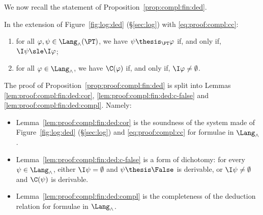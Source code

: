 We now recall the statement of Proposition~\ref{prop:compl:fin:ded}.

\begin{proposition}
\label{prop:proof:compl:fin:ded}
In the extension of Figure~\ref{fig:log:ded} (\S\ref{sec:log})
with \eqref{eq:proof:compl:cc}:
\begin{enumerate}[(1)]
\item
for all $\varphi,\psi \in \Lang_\land(\PT)$,
we have
$\psi \thesis_\PT \varphi$
if, and only if,
$\I\psi \sle \I\varphi$;

\item
for all $\varphi \in \Lang_\land$,
we have
$\C(\varphi)$
if, and only if,
$\I\varphi \neq \emptyset$.
\end{enumerate}
\end{proposition}

The proof of Proposition~\ref{prop:proof:compl:fin:ded}
is split into Lemmas \ref{lem:proof:compl:fin:ded:cor},
\ref{lem:proof:compl:fin:ded:c-false}
and
\ref{lem:proof:compl:fin:ded:compl}.
Namely:
\begin{itemize}
\item
Lemma~\ref{lem:proof:compl:fin:ded:cor} is the soundness of
the system made of Figure~\ref{fig:log:ded} (\S\ref{sec:log})
and \eqref{eq:proof:compl:cc} for formulae in $\Lang_\land$.

\item
Lemma~\ref{lem:proof:compl:fin:ded:c-false} is a form of dichotomy:
for every $\psi \in \Lang_\land$,
either $\I\psi = \emptyset$ and $\psi \thesis \False$ is derivable,
or $\I\psi \neq \emptyset$ and $\C(\psi)$ is derivable.

\item
Lemma~\ref{lem:proof:compl:fin:ded:compl} is the completeness
of the deduction relation for formulae in $\Lang_\land$.
\end{itemize}

